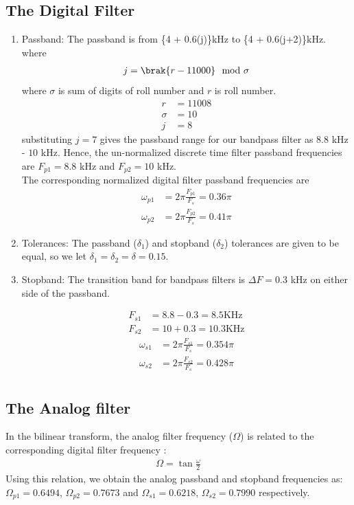 \documentclass{article}
\begin{document}
\subsection{The Digital Filter}
\begin{enumerate}
\item {Passband:}
The passband is from \{4 + 0.6(j)\}kHz to \{4 + 0.6(j+2)\}kHz. \\
where 
\begin{align}
    j=\brak{r-11000} \mod \sigma
\end{align}
where $\sigma$ is sum of digits of roll number and $r$ is roll number.\\
\begin{align}
    r&=11008\\
    \sigma  &= 10\\
    j&=8
\end{align}
 substituting $j =7$ gives the passband
range for our bandpass filter as $8.8$ kHz - $10$ kHz.  Hence, the un-normalized discrete time filter
passband frequencies are $F_{p1} = 8.8$ kHz
and $F_{p2} = 10$ kHz. \\
The corresponding normalized digital filter passband frequencies are
\begin{align}
    \omega_{p1} &= 2\pi\frac{F_{p1}}{F_s} = 0.36 \pi\\
    \omega_{p2} &= 2\pi\frac{F_{p2}}{F_s}  =0.41 \pi
\end{align}

\item {Tolerances:}  The passband ($\delta_1$) and stopband ($\delta_2$) tolerances are given to
be equal, so we let $\delta_1 = \delta_2 = \delta = 0.15$.

\item { Stopband:}  The {transition band} for bandpass filters is $\Delta F = 0.3$ kHz on either side of the passband.

\begin{align}
    F_{s1} &= 8.8-0.3 = 8.5 \text{KHz}\\
    F	_{s2} &= 10+0.3 = 10.3  \text{KHz}
\end{align}
\begin{align}
    \omega_{s1} &= 2\pi\frac{F_{s1}}{F_s} = 0.354 \pi\\
     \omega_{s2} &= 2\pi\frac{F_{s2}}{F_s} = 0.428 \pi\\
\end{align}
\end{enumerate}
\subsection{The Analog filter}
In the bilinear transform, the analog filter frequency ($\Omega$) is related to the corresponding digital filter frequency\brak{\omega} :
\begin{align}
  \Omega = \tan \frac{\omega}{2}  
\end{align}
Using this relation, we obtain the analog passband and stopband frequencies as:
$\Omega_{p1} = 0.6494$, $\Omega_{p2} = 0.7673$ and $\Omega_{s1} = 0.6218$, $\Omega_{s2} = 0.7990$
respectively.
\end{document}

